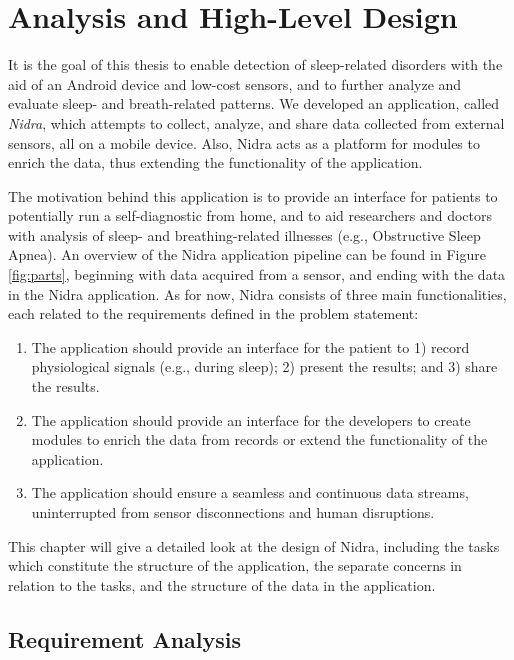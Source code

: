 
\chapter{Analysis and High-Level Design}

It is the goal of this thesis to enable detection of sleep-related disorders with the aid of an Android device and low-cost sensors, and to further analyze and evaluate sleep- and breath-related patterns. We developed an application, called \textit{Nidra}, which attempts to collect, analyze, and share data collected from external sensors, all on a mobile device. Also, Nidra acts as a platform for modules to enrich the data, thus extending the functionality of the application.

The motivation behind this application is to provide an interface for patients to potentially run a self-diagnostic from home, and to aid researchers and doctors with analysis of sleep- and breathing-related illnesses (e.g., Obstructive Sleep Apnea). An overview of the Nidra application pipeline can be found in Figure \ref{fig:parts}, beginning with data acquired from a sensor, and ending with the data in the Nidra application. As for now, Nidra consists of three main functionalities, each related to the requirements defined in the problem statement: 

\begin{enumerate}
    \item The application should provide an interface for the patient to 1) record physiological signals (e.g., during sleep); 2) present the results; and 3) share the results.
    \item The application should provide an interface for the developers to create modules to enrich the data from records or extend the functionality of the application. 
    \item The application should ensure a seamless and continuous data streams, uninterrupted from sensor disconnections and human disruptions.
\end{enumerate}

This chapter will give a detailed look at the design of Nidra, including the tasks which constitute the structure of the application, the separate concerns in relation to the tasks, and the structure of the data in the application.

\section{Requirement Analysis}

